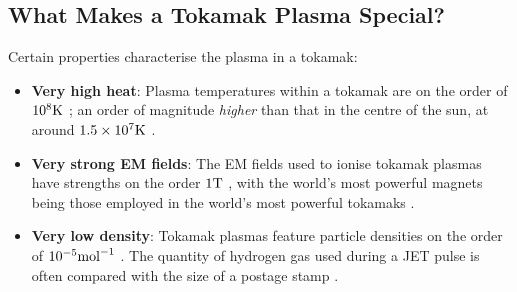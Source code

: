    \subsection{What Makes a Tokamak Plasma Special?}
        Certain properties characterise the plasma in a tokamak:
        \begin{itemize}
            \item  {\bf Very high heat}: Plasma temperatures within a tokamak are on the order of $10^{8}\mathrm{K}$ \BA{[Ref]}; an order of magnitude \emph{higher} than that in the centre of the sun, at around $1.5\times10^{7}\mathrm{K}$ \BA{[Ref]}.
            \item  {\bf Very strong EM fields}: The EM fields used to ionise tokamak plasmas have strengths on the order $1\mathrm{T}$ \BA{[Ref]}, with the world's most powerful magnets being those employed in the world's most powerful tokamaks \BA{[Ref]}.
            \item  {\bf Very low density}:  Tokamak plasmas feature particle densities on the order of $10^{- 5}{\rm mol}^{- 1}$   \BA{[Ref]}. The quantity of hydrogen gas used during a JET pulse is often compared with the size  of a postage stamp \BA{[Ref]}.
        \end{itemize}


        
